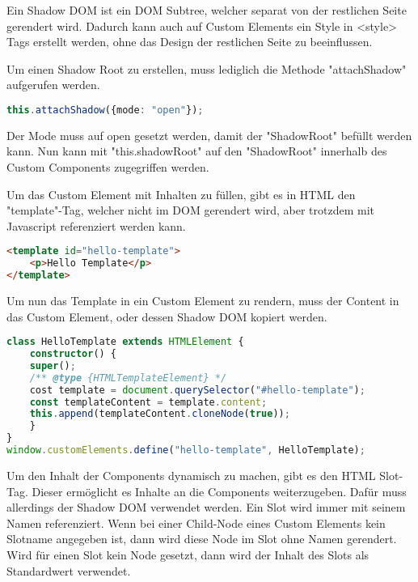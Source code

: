
Ein Shadow DOM ist ein DOM Subtree, welcher separat von der restlichen Seite gerendert wird. Dadurch kann auch auf Custom Elements ein Style in <style> Tags erstellt werden, ohne das Design der restlichen Seite zu beeinflussen.

Um einen Shadow Root zu erstellen, muss lediglich die Methode "attachShadow" aufgerufen werden. 

\begin{lstlisting}[language=TypeScript,caption={Erstellung eines Shadow Roots}]
this.attachShadow({mode: "open"});
\end{lstlisting}

Der Mode muss auf open gesetzt werden, damit der "ShadowRoot" befüllt werden kann. Nun kann mit "this.shadowRoot" auf den "ShadowRoot" innerhalb des Custom Components zugegriffen werden.

\cite{MDNShadowRoot}


Um das Custom Element mit Inhalten zu füllen, gibt es in HTML den "template"-Tag, welcher nicht im DOM gerendert wird, aber trotzdem mit Javascript referenziert werden kann. 

\begin{lstlisting}[language=HTML,caption={Erstellung eines HTML Templates}]
<template id="hello-template">
    <p>Hello Template</p>
</template>
\end{lstlisting}

Um nun das Template in ein Custom Element zu rendern, muss der Content in das Custom Element, oder dessen Shadow DOM kopiert werden.

\begin{lstlisting}[language=TypeScript,caption={Kopieren des Templates in das Custom Element}]
class HelloTemplate extends HTMLElement {
    constructor() {
    super();
    /** @type {HTMLTemplateElement} */
    cost template = document.querySelector("#hello-template");
    const templateContent = template.content;
    this.append(templateContent.cloneNode(true));
    }
}
window.customElements.define("hello-template", HelloTemplate);
\end{lstlisting}

Um den Inhalt der Components dynamisch zu machen, gibt es den HTML Slot-Tag. Dieser ermöglicht es Inhalte an die Components weiterzugeben. Dafür muss allerdings der Shadow DOM verwendet werden. Ein Slot wird immer mit seinem Namen referenziert. Wenn bei einer Child-Node eines Custom Elements kein Slotname angegeben ist, dann wird diese Node im Slot ohne Namen gerendert. Wird für einen Slot kein Node gesetzt, dann wird der Inhalt des Slots als Standardwert verwendet. 

